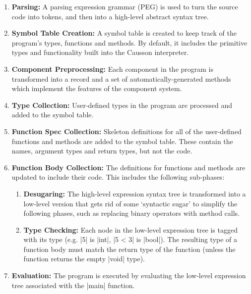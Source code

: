 \documentclass[11pt]{report}
\begin{document}
\begin{enumerate}
    \item \textbf{Parsing:} A parsing expression grammar (PEG) is used to turn the source code into tokens, and then into a high-level abstract syntax tree.
    
    \item \textbf{Symbol Table Creation:} A symbol table is created to keep track of the program's types, functions and methods. By default, it includes the primitive types and functionality built into the Causson interpreter.
    
    \item \textbf{Component Preprocessing:} Each component in the program is transformed into a record and a set of automatically-generated methods which implement the features of the component system.
    
    \item \textbf{Type Collection:} User-defined types in the program are processed and added to the symbol table.
    
    \item \textbf{Function Spec Collection:} Skeleton definitions for all of the user-defined functions and methods are added to the symbol table. These contain the names, argument types and return types, but not the code.
    
    \item \textbf{Function Body Collection:} The definitions for functions and methods are updated to include their code. This includes the following sub-phases:
    
    \begin{enumerate}
        \item \textbf{Desugaring:} The high-level expression syntax tree is transformed into a low-level version that gets rid of some `syntactic sugar' to simplify the following phases, such as replacing binary operators with method calls.
        
        \item \textbf{Type Checking:} Each node in the low-level expression tree is tagged with its type (e.g. |5| is |int|, |5 < 3| is |bool|). The resulting type of a function body must match the return type of the function (unless the function returns the empty |void| type).
    \end{enumerate}
    
    \item \textbf{Evaluation:} The program is executed by evaluating the low-level expression tree associated with the |main| function.
\end{enumerate}
\end{document}
